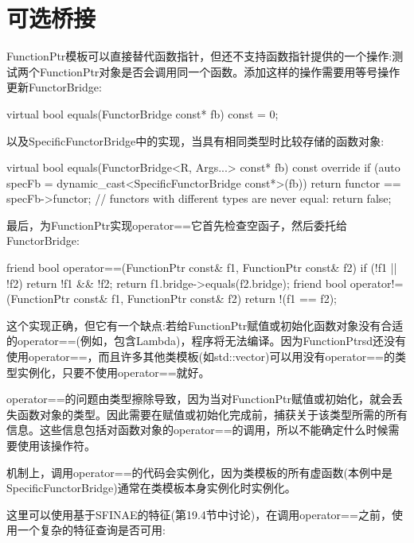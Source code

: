\section{可选桥接}
FunctionPtr模板可以直接替代函数指针，但还不支持函数指针提供的一个操作:测试两个FunctionPtr对象是否会调用同一个函数。添加这样的操作需要用等号操作更新FunctorBridge:

\begin{cpp}
virtual bool equals(FunctorBridge const* fb) const = 0;
\end{cpp}

以及SpecificFunctorBridge中的实现，当具有相同类型时比较存储的函数对象:

\begin{cpp}
virtual bool equals(FunctorBridge<R, Args...> const* fb) const override {
	if (auto specFb = dynamic_cast<SpecificFunctorBridge const*>(fb)) {
		return functor == specFb->functor;
	}
	// functors with different types are never equal:
	return false;
}
\end{cpp}

最后，为FunctionPtr实现operator==它首先检查空函子，然后委托给FunctorBridge:

\begin{cpp}
friend bool
operator==(FunctionPtr const& f1, FunctionPtr const& f2) {
	if (!f1 || !f2) {
		return !f1 && !f2;
	}
	return f1.bridge->equals(f2.bridge);
}
friend bool
operator!=(FunctionPtr const& f1, FunctionPtr const& f2) {
	return !(f1 == f2);
}
\end{cpp}

这个实现正确，但它有一个缺点:若给FunctionPtr赋值或初始化函数对象没有合适的operator==(例如，包含Lambda)，程序将无法编译。因为FunctionPtrsd还没有使用operator==，而且许多其他类模板(如std::vector)可以用没有operator==的类型实例化，只要不使用operator==就好。

operator==的问题由类型擦除导致，因为当对FunctionPtr赋值或初始化，就会丢失函数对象的类型。因此需要在赋值或初始化完成前，捕获关于该类型所需的所有信息。这些信息包括对函数对象的operator==的调用，所以不能确定什么时候需要使用该操作符。

\begin{notice}
机制上，调用operator==的代码会实例化，因为类模板的所有虚函数(本例中是SpecificFunctorBridge)通常在类模板本身实例化时实例化。
\end{notice}

这里可以使用基于SFINAE的特征(第19.4节中讨论)，在调用operator==之前，使用一个复杂的特征查询是否可用:

